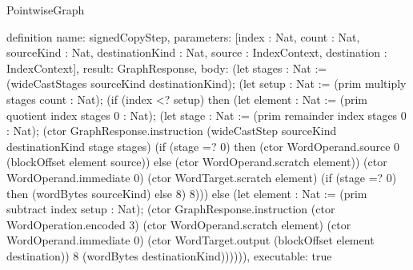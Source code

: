 \begin{lexlean}{PointwiseGraph}
\begin{semanticmodule}
definition{
  name: signedCopyStep,
  parameters: [index : Nat, count : Nat, sourceKind : Nat, destinationKind : Nat, source : IndexContext, destination : IndexContext],
  result: GraphResponse,
  body: (let stages : Nat := (wideCastStages sourceKind destinationKind);
    (let setup : Nat := (prim multiply stages count : Nat);
      (if (index <? setup) then
        (let element : Nat := (prim quotient index stages 0 : Nat);
          (let stage : Nat := (prim remainder index stages 0 : Nat);
            (ctor GraphResponse.instruction (wideCastStep sourceKind destinationKind stage stages)
              (if (stage =? 0) then (ctor WordOperand.source 0 (blockOffset element source)) else (ctor WordOperand.scratch element))
              (ctor WordOperand.immediate 0) (ctor WordTarget.scratch element) (if (stage =? 0) then (wordBytes sourceKind) else 8) 8)))
      else (let element : Nat := (prim subtract index setup : Nat);
        (ctor GraphResponse.instruction (ctor WordOperation.encoded 3) (ctor WordOperand.scratch element)
          (ctor WordOperand.immediate 0) (ctor WordTarget.output (blockOffset element destination)) 8 (wordBytes destinationKind)))))),
  executable: true
}


\end{semanticmodule}
\end{lexlean}
